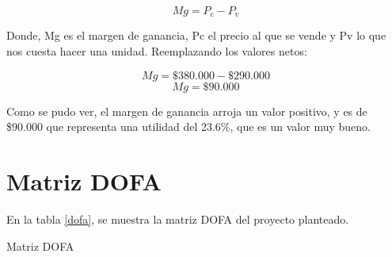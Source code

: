 \documentclass[letterpaper,12pt]{scrreprt}
\begin{document}
    \[Mg = P_{c} - P_{v}\]

    Donde, Mg es el margen de ganancia, Pc el precio al que se vende y Pv lo que nos cuesta hacer una unidad. Reemplazando los valores netos:

    \[Mg = \$ 380.000 - \$ 290.000\]
    \[Mg = \$ 90.000\]

    Como se pudo ver, el margen de ganancia arroja un valor positivo, y es de \$90.000 que representa una utilidad del 23.6\%, que es un valor muy bueno.
\chapter{Matriz DOFA}

En la tabla \ref{dofa}, se muestra la matriz DOFA del proyecto planteado. 

         \begin{table}[H]
        \centering
        \caption{Matriz DOFA}
        \label{dofa}


\end{table}
\end{document}
